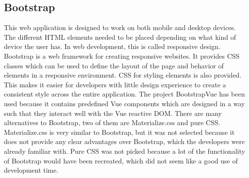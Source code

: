 \subsection{Bootstrap}
This web application is designed to work on both mobile and desktop devices. The different HTML elements needed to be placed depending on what kind of device the user has. In web development, this is called responsive design. Bootstrap\cite{Bootstrap:Info} is a web framework for creating responsive websites. It provides CSS classes which can be used to define the layout of the page and behavior of elements in a responsive environment. CSS for styling elements is also provided. This makes it easier for developers with little design experience to create a consistent style across the entire application. The project BootstrapVue\cite{BootstrapVue:Info} has been used because it contains predefined Vue components which are designed in a way such that they interact well with the Vue reactive DOM. There are many alternatives to Bootstrap, two of them are Materialize.css and pure CSS. Materialize.css is very similar to Bootstrap, but it was not selected because it does not provide any clear advantages over Bootstrap, which the developers were already familiar with. Pure CSS was not picked because a lot of the functionality of Bootstrap would have been recreated, which did not seem like a good use of development time.